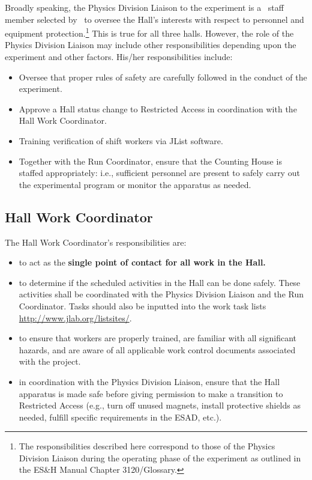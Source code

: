 \documentclass[11pt]{article}
\begin{document}
Broadly speaking, the Physics Division Liaison to the experiment 
is a \HALL\ staff member selected by  \HALLLEADER ~to oversee the Hall's interests with respect to personnel and equipment 
protection.\footnote{The responsibilities described here correspond 
to those of the Physics Division Liaison during
the operating phase of the experiment as outlined in the
ES\&H Manual Chapter 3120/Glossary.} 
This is true for all three halls. However, the role of
the Physics Division Liaison may include other responsibilities
depending upon the experiment and other factors. His/her responsibilities
include:
\begin{itemize}
\item Oversee that proper rules of safety are carefully followed in the 
conduct of the experiment.
\item Approve a Hall status change to Restricted Access in coordination
with the Hall Work Coordinator.
\item Training verification of shift workers via JList software.
\item Together with the Run Coordinator, 
ensure that the Counting House is staffed appropriately: i.e.,
sufficient personnel are present to safely carry out the experimental 
program or monitor the apparatus as needed.
\end{itemize}  

\subsection{Hall Work Coordinator}

The Hall Work Coordinator's responsibilities are: 

\begin{itemize}

\item  to act as the {\bf single point of contact for all work in the Hall.}

\item to determine if the scheduled activities in the Hall can be done safely.
These activities shall be coordinated with the Physics Division Liaison
and the Run Coordinator.   Tasks should also be inputted into the work task
lists \url{http://www.jlab.org/listsites/}.

\item to ensure that workers are properly trained, are familiar with all
significant hazards, and are aware of all applicable work control
documents associated with the project. 

\item in coordination with the Physics Division Liaison, 
ensure that the Hall apparatus is made safe before giving permission to
make a transition to Restricted Access (e.g., turn off unused magnets,
install protective shields as needed, fulfill specific requirements in the
ESAD, etc.).

 
\end{itemize}
\end{document}
